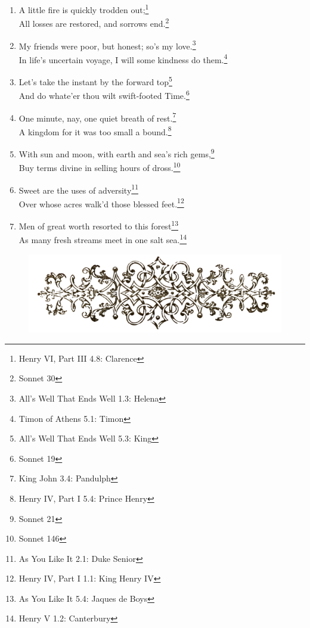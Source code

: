 \documentclass[17pt,twoside]{extarticle}
\begin{document}
\begin{enumerate}
  impair not beauty being mute.\footnote{Sonnet 83}
\item
  A little fire is quickly trodden out;\footnote{Henry VI, Part III 4.8:
    Clarence}\\All losses are restored, and sorrows end.\footnote{Sonnet
    30}
\item
  My friends were poor, but honest; so's my love.\footnote{All's Well
    That Ends Well 1.3: Helena}\\In life's uncertain voyage, I will some
  kindness do them.\footnote{Timon of Athens 5.1: Timon}
\item
  Let's take the instant by the forward top\footnote{All's Well That
    Ends Well 5.3: King}\\And do whate'er thou wilt swift-footed
  Time.\footnote{Sonnet 19}
\item
  One minute, nay, one quiet breath of rest.\footnote{King John 3.4:
    Pandulph}\\A kingdom for it was too small a bound.\footnote{Henry
    IV, Part I 5.4: Prince Henry}
\item
  With sun and moon, with earth and sea's rich gems,\footnote{Sonnet 21}\\Buy
  terms divine in selling hours of dross.\footnote{Sonnet 146}
\item
  Sweet are the uses of adversity\footnote{As You Like It 2.1: Duke
    Senior}\\Over whose acres walk'd those blessed feet.\footnote{Henry
    IV, Part I 1.1: King Henry IV}
\item
  Men of great worth resorted to this forest\footnote{As You Like It
    5.4: Jaques de Boys}\\As many fresh streams meet in one salt
  sea.\footnote{Henry V 1.2: Canterbury}
\end{enumerate}

\vspace{1.4cm}

\begin{figure}[htbp]
\centering
\includegraphics[width=15.5cm]{images/frontispiece.png}
\end{figure}
\end{document}
